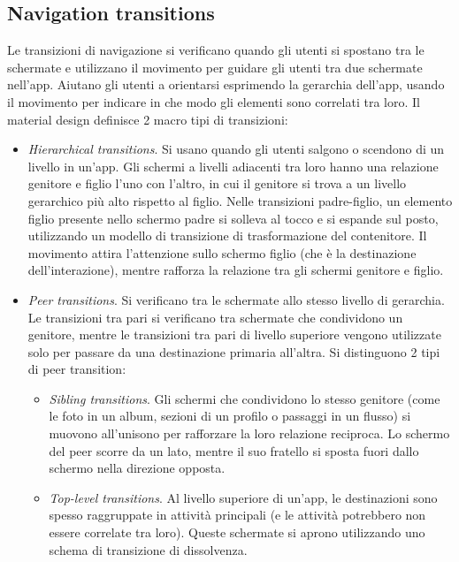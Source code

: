 \documentclass[12pt, a4paper]{report}
\begin{document}
    		\subsection{Navigation transitions}
    		Le transizioni di navigazione si verificano quando gli utenti si spostano tra le schermate e utilizzano il movimento per guidare gli utenti tra due schermate nell'app. Aiutano gli utenti
    		a orientarsi esprimendo la gerarchia dell'app, usando il movimento per indicare in che modo gli elementi sono correlati tra loro. Il material design definisce 2 macro tipi di transizioni:
    		\begin{itemize}
    			\item \textit{Hierarchical transitions}. Si usano quando gli utenti salgono o scendono di un livello in un'app. Gli schermi a livelli adiacenti tra loro hanno una relazione genitore e
    			figlio l'uno con l'altro, in cui il genitore si trova a un livello gerarchico più alto rispetto al figlio. Nelle transizioni padre-figlio, un elemento figlio presente nello schermo padre
    			si solleva al tocco e si espande sul posto, utilizzando un modello di transizione di trasformazione del contenitore. Il movimento attira l'attenzione sullo schermo figlio (che è la destinazione
    			dell'interazione), mentre rafforza la relazione tra gli schermi genitore e figlio.
    			\item \textit{Peer transitions}. Si verificano tra le schermate allo stesso livello di gerarchia. Le transizioni tra pari si verificano tra schermate che condividono un genitore, mentre le transizioni tra pari
    			di livello superiore vengono utilizzate solo per passare da una destinazione primaria all'altra. Si distinguono 2 tipi di peer transition:
    			\begin{itemize}
    				\item \textit{Sibling transitions}. Gli schermi che condividono lo stesso genitore (come le foto in un album, sezioni di un profilo o passaggi in un flusso) si muovono all'unisono per
    				rafforzare la loro relazione reciproca. Lo schermo del peer scorre da un lato, mentre il suo fratello si sposta fuori dallo schermo nella direzione opposta.
    				\item \textit{Top-level transitions}. Al livello superiore di un'app, le destinazioni sono spesso raggruppate in attività principali (e le attività potrebbero non essere correlate tra loro).
    				Queste schermate si aprono utilizzando uno schema di transizione di dissolvenza.
    			\end{itemize}
    		\end{itemize}
\end{document}

